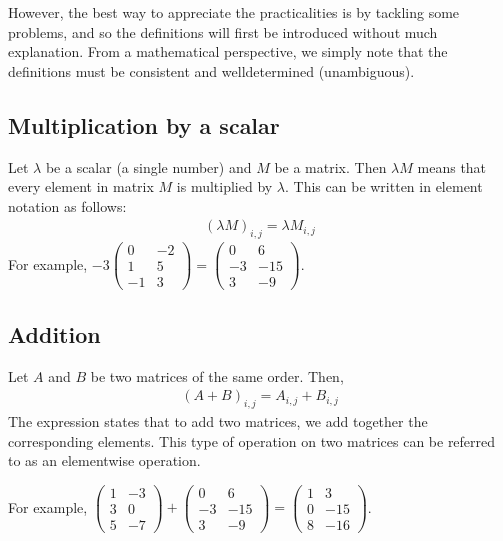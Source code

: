 \documentclass[letterpaper,10pt,english]{jupyterBook}
\begin{document}
\sphinxAtStartPar
However, the best way to appreciate the practicalities is by tackling some problems, and so the definitions will first be introduced without much explanation. From a mathematical perspective, we simply note that the definitions must be consistent and well\sphinxhyphen{}determined (unambiguous).


\subsection{Multiplication by a scalar}
\label{\detokenize{LinearAlgebra/linear_systems_matrices/matrices:multiplication-by-a-scalar}}
\sphinxAtStartPar
Let \(\lambda\) be a scalar (a single number) and \(M\) be a matrix. Then \(\lambda M\) means that every element in matrix \(M\) is multiplied by \(\lambda\). This can be written in element notation as follows:
\begin{equation*}
\begin{split} (\lambda M)_{i,j} = \lambda M_{i,j}\end{split}
\end{equation*}
\sphinxAtStartPar
For example, \( -3\left( \begin{matrix} 0 & -2 \\ 1 & 5 \\ -1 & 3 \end{matrix} \right) = \left( \begin{matrix} 0 & 6 \\ -3 & -15 \\ 3 & -9 \end{matrix} \right) \).


\subsection{Addition}
\label{\detokenize{LinearAlgebra/linear_systems_matrices/matrices:addition}}
\sphinxAtStartPar
Let \(A\) and \(B\) be two matrices of the same order. Then,
\begin{equation*}
\begin{split}\left(A + B\right)_{i,j} = A_{i,j} + B_{i,j}\end{split}
\end{equation*}
\sphinxAtStartPar
The expression states that to add two matrices, we add together the corresponding elements. This type of operation on two matrices can be referred to as an element\sphinxhyphen{}wise operation.

\sphinxAtStartPar
For example, \( \left( \begin{matrix} 1 & -3 \\ 3 & 0 \\ 5 & -7 \end{matrix} \right) + \left( \begin{matrix} 0 & 6 \\ -3 & -15 \\ 3 & -9 \end{matrix} \right) = \left( \begin{matrix} 1 & 3 \\ 0 & -15 \\ 8 & -16 \end{matrix} \right) \).
\end{document}
